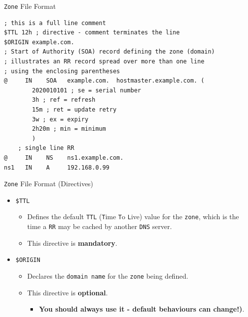 \documentclass[aspectratio=169,xcolor=table]{beamer}
\begin{document}
\begin{frame}[fragile]{\texttt{Zone} File Format}
  \lstset{
    basicstyle=\scriptsize\ttfamily,
  }
  \begin{lstlisting}
; this is a full line comment
$TTL 12h ; directive - comment terminates the line
$ORIGIN example.com.
; Start of Authority (SOA) record defining the zone (domain)
; illustrates an RR record spread over more than one line
; using the enclosing parentheses
@     IN    SOA   example.com.  hostmaster.example.com. (
        2020010101 ; se = serial number
        3h ; ref = refresh
        15m ; ret = update retry
        3w ; ex = expiry
        2h20m ; min = minimum
        )
    ; single line RR
@     IN    NS    ns1.example.com.
ns1   IN    A     192.168.0.99
  \end{lstlisting}
\end{frame}

\begin{frame}{\texttt{Zone} File Format (Directives)}
  \begin{itemize}
    \item \texttt{\$TTL}
      \begin{itemize}
        \item Defines the default \texttt{TTL} (\texttt{T}ime \texttt{T}o \texttt{L}ive) value for the \texttt{zone}, which is the time a \texttt{RR} may be cached by another \texttt{DNS} server.
        \item This directive is \textbf{mandatory}.
      \end{itemize}
      \item \texttt{\$ORIGIN}
      \begin{itemize}
        \item Declares the \texttt{domain name} for the \texttt{zone} being defined.
        \item This directive is \textbf{optional}.
        \begin{itemize} 
          \item \textbf{You should always use it - default behaviours can change!)}.
        \end{itemize}
      \end{itemize}
  \end{itemize}
\end{frame}
\end{document}
